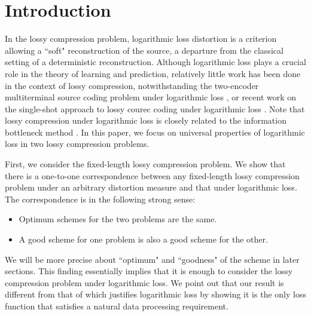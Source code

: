 \documentclass[draftclsnofoot, onecolumn, letterpaper, romanappendices]{IEEEtran}
\begin{document}
\section{Introduction}\label{sec:Introduction}
In the lossy compression problem, logarithmic loss distortion is a criterion
allowing a ``soft" reconstruction of the source, a departure from the classical
setting of a deterministic reconstruction.
Although logarithmic loss plays a crucial role in the theory of learning and prediction,
relatively little work has been done in the context of lossy compression,
notwithstanding the two-encoder multiterminal source coding problem under logarithmic loss
\cite{courtade2011multiterminal, courtade2014multiterminal},
or recent work on the single-shot approach to lossy courec coding under logarithmic loss \cite{shkel2016singleshot}.
Note that lossy compression under logarithmic loss is closely related to the information
bottleneck method \cite{tishby1999bottleneck, harremoes2007information, gilad2003information}.
In this paper, we focus on universal properties of logarithmic loss in two lossy compression problems. 

First, we consider the fixed-length lossy compression problem.
We show that there is a one-to-one correspondence between any fixed-length lossy compression
problem under an arbitrary distortion measure and that under logarithmic loss.
The correspondence is in the following strong sense:
\begin{itemize}
    \item Optimum schemes for the two problems are the same.
    \item A good scheme for one problem is also a good scheme for the other.
\end{itemize}
We will be more precise about ``optimum" and ``goodness" of the scheme in later sections.
This finding essentially implies that it is enough to consider the lossy compression problem
under logarithmic loss.
We point out that our result is different from that of \cite{jiao2015justification}
which justifies  logarithmic loss by showing it is the only loss function
that satisfies a natural data processing requirement.
\end{document}
